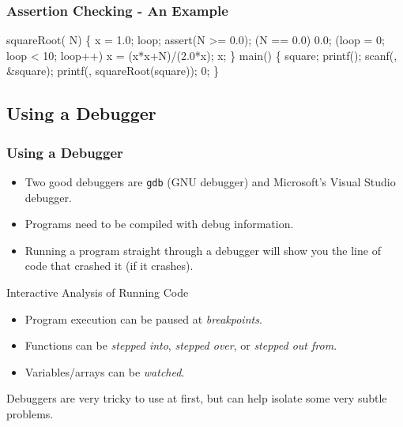 \documentclass[smaller,table]{beamer} %
\begin{document}
\begin{frame}[fragile]
\frametitle{Assertion Checking - An Example}
\vspace{-0.2in}
\begin{semiverbatim}
\scriptsize
\kr\kl{} 
\kl{} 
\kl{}
\kl{} squareRoot( N)
\kl\{
\kl   {} x = 1.0;
\kl   {} loop;
\kl   {}
\kl   assert(N >= 0.0);
\kl   {} (N == 0.0)  0.0;
\kl   {} (loop = 0; loop < 10; loop++)
\kl      x = (x*x+N)/(2.0*x);
\kl   {} x;
\kl\}
\kl
\kl{} main()
\kl\{
\kl   {} square;
\kl   printf();
\kl   scanf(, \&square);
\kl   {}
\kl   printf(, squareRoot(square));
\kl   {} 0;
\kl\}
\end{semiverbatim}
\end{frame}

\subsection{Using a Debugger}
\begin{frame}
\frametitle{Using a Debugger}
\begin{itemize}
\item Two good debuggers are {\tt gdb} (GNU debugger) and Microsoft's Visual Studio debugger.
\item Programs need to be compiled with debug information.
\item Running a program straight through a debugger will show you the line of code that crashed it (if it crashes).
\end{itemize}

\begin{exampleblock}{Interactive Analysis of Running Code}
\begin{itemize}
\item Program execution can be paused at \emph{breakpoints}.
\item Functions can be \emph{stepped into}, \emph{stepped over}, or
\emph{stepped out from}.
\item Variables/arrays can be \emph{watched}.
\end{itemize}
\end{exampleblock}

\begin{alertblock}{}
Debuggers are very tricky to use at first, but can help isolate some very subtle problems.
\end{alertblock}
\end{frame}
\end{document}
